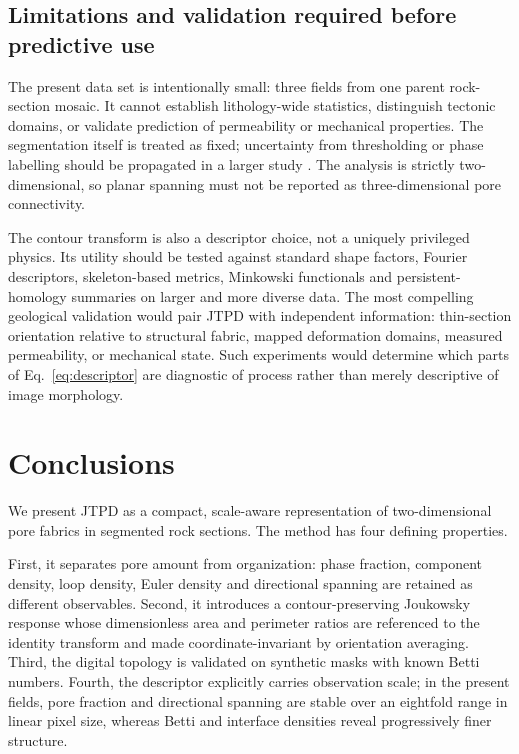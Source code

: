 \documentclass[preprint,12pt,authoryear]{elsarticle}
\begin{document}
\subsection{Limitations and validation required before predictive use}

The present data set is intentionally small: three fields from one parent rock-section mosaic. It cannot establish lithology-wide statistics, distinguish tectonic domains, or validate prediction of permeability or mechanical properties. The segmentation itself is treated as fixed; uncertainty from thresholding or phase labelling should be propagated in a larger study \citep{Iassonov2009}. The analysis is strictly two-dimensional, so planar spanning must not be reported as three-dimensional pore connectivity.

The contour transform is also a descriptor choice, not a uniquely privileged physics. Its utility should be tested against standard shape factors, Fourier descriptors, skeleton-based metrics, Minkowski functionals and persistent-homology summaries on larger and more diverse data. The most compelling geological validation would pair JTPD with independent information: thin-section orientation relative to structural fabric, mapped deformation domains, measured permeability, or mechanical state. Such experiments would determine which parts of Eq.~\ref{eq:descriptor} are diagnostic of process rather than merely descriptive of image morphology.

\section{Conclusions}

We present JTPD as a compact, scale-aware representation of two-dimensional pore fabrics in segmented rock sections. The method has four defining properties.

First, it separates pore amount from organization: phase fraction, component density, loop density, Euler density and directional spanning are retained as different observables. Second, it introduces a contour-preserving Joukowsky response whose dimensionless area and perimeter ratios are referenced to the identity transform and made coordinate-invariant by orientation averaging. Third, the digital topology is validated on synthetic masks with known Betti numbers. Fourth, the descriptor explicitly carries observation scale; in the present fields, pore fraction and directional spanning are stable over an eightfold range in linear pixel size, whereas Betti and interface densities reveal progressively finer structure.
\end{document}
